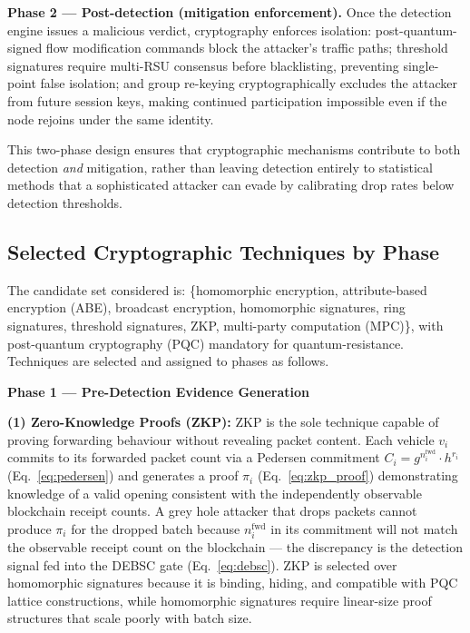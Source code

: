 \documentclass[12pt, a4paper]{report}
\newcommand{\mypar}{\vspace{0.8em}\noindent}
\begin{document}
\textbf{Phase 2 --- Post-detection (mitigation enforcement).}
Once the detection engine issues a malicious verdict, cryptography enforces isolation: post-quantum-signed flow modification commands block the attacker's traffic paths; threshold signatures require multi-RSU consensus before blacklisting, preventing single-point false isolation; and group re-keying cryptographically excludes the attacker from future session keys, making continued participation impossible even if the node rejoins under the same identity.

This two-phase design ensures that cryptographic mechanisms contribute to both
detection \emph{and} mitigation, rather than leaving detection entirely to
statistical methods that a sophisticated attacker can evade by calibrating drop
rates below detection thresholds.

\subsection{Selected Cryptographic Techniques by Phase}

The candidate set considered is: \{homomorphic encryption, attribute-based
encryption (ABE), broadcast encryption, homomorphic signatures, ring signatures,
threshold signatures, ZKP, multi-party computation (MPC)\}, with post-quantum
cryptography (PQC) mandatory for quantum-resistance. Techniques are selected
and assigned to phases as follows.

\mypar
\textbf{Phase 1 --- Pre-Detection Evidence Generation}

\textbf{(1) Zero-Knowledge Proofs (ZKP):}
ZKP is the sole technique capable of proving forwarding behaviour without
revealing packet content. Each vehicle $v_i$ commits to its forwarded packet
count via a Pedersen commitment $C_i = g^{n_i^{\text{fwd}}} \cdot h^{r_i}$
(Eq.~\eqref{eq:pedersen}) and generates a proof $\pi_i$
(Eq.~\eqref{eq:zkp_proof}) demonstrating knowledge of a valid opening
consistent with the independently observable blockchain receipt counts. A grey
hole attacker that drops packets cannot produce $\pi_i$ for the dropped batch
because $n_i^{\text{fwd}}$ in its commitment will not match the observable
receipt count on the blockchain --- the discrepancy is the detection signal fed
into the DEBSC gate (Eq.~\eqref{eq:debsc}). ZKP is selected over homomorphic
signatures because it is binding, hiding, and compatible with PQC lattice
constructions, while homomorphic signatures require linear-size proof structures
that scale poorly with batch size.
\end{document}
